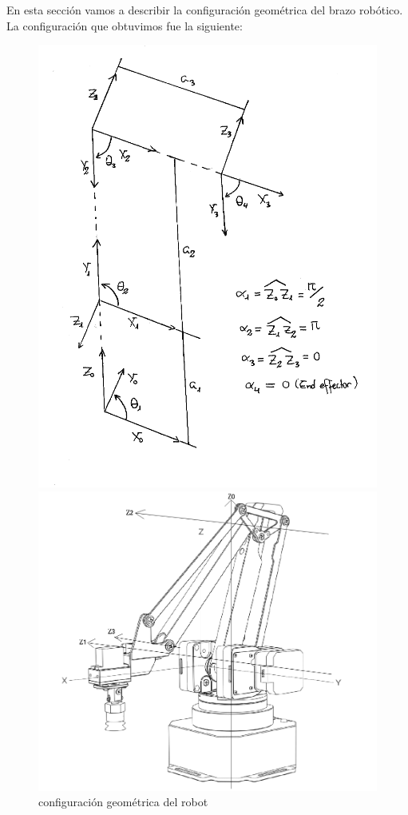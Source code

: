 \documentclass[a4paper,12pt]{article}
\begin{document}
En esta sección vamos a describir la configuración geométrica del brazo robótico. La
configuración que obtuvimos fue la siguiente:
\begin{figure}[H]
    \begin{minipage}{.4\linewidth}
        \centering
        \includegraphics[width=\linewidth]{images/geometric_configuration_2.png}
        \caption{configuración geométrica del robot}
        \label{fig:robot_config}
    \end{minipage}\hfill
    \begin{minipage}{.48\linewidth}
        \centering
        \includegraphics[width=\linewidth]{images/axis.png}

\end{minipage}
\end{figure}
\end{document}
